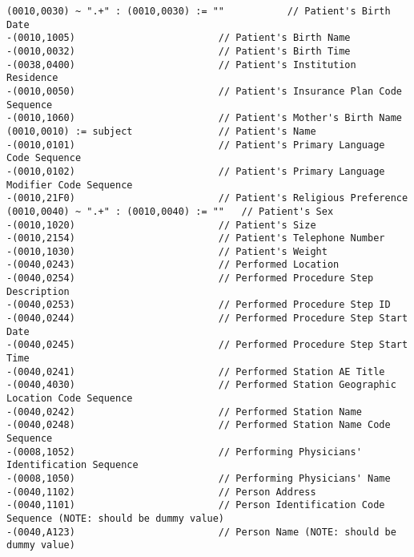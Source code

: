 \documentclass{beamer}  %
\begin{document}
\begin{frame}[fragile]
\tiny
\begin{verbatim}
(0010,0030) ~ ".+" : (0010,0030) := ""           // Patient's Birth Date
-(0010,1005)                         // Patient's Birth Name
-(0010,0032)                         // Patient's Birth Time
-(0038,0400)                         // Patient's Institution Residence
-(0010,0050)                         // Patient's Insurance Plan Code Sequence
-(0010,1060)                         // Patient's Mother's Birth Name
(0010,0010) := subject               // Patient's Name
-(0010,0101)                         // Patient's Primary Language Code Sequence
-(0010,0102)                         // Patient's Primary Language Modifier Code Sequence
-(0010,21F0)                         // Patient's Religious Preference
(0010,0040) ~ ".+" : (0010,0040) := ""   // Patient's Sex
-(0010,1020)                         // Patient's Size
-(0010,2154)                         // Patient's Telephone Number
-(0010,1030)                         // Patient's Weight
-(0040,0243)                         // Performed Location
-(0040,0254)                         // Performed Procedure Step Description
-(0040,0253)                         // Performed Procedure Step ID
-(0040,0244)                         // Performed Procedure Step Start Date
-(0040,0245)                         // Performed Procedure Step Start Time
-(0040,0241)                         // Performed Station AE Title
-(0040,4030)                         // Performed Station Geographic Location Code Sequence
-(0040,0242)                         // Performed Station Name
-(0040,0248)                         // Performed Station Name Code Sequence
-(0008,1052)                         // Performing Physicians' Identification Sequence
-(0008,1050)                         // Performing Physicians' Name
-(0040,1102)                         // Person Address
-(0040,1101)                         // Person Identification Code Sequence (NOTE: should be dummy value)
-(0040,A123)                         // Person Name (NOTE: should be dummy value)
\end{verbatim}
\end{frame}
\end{document}
